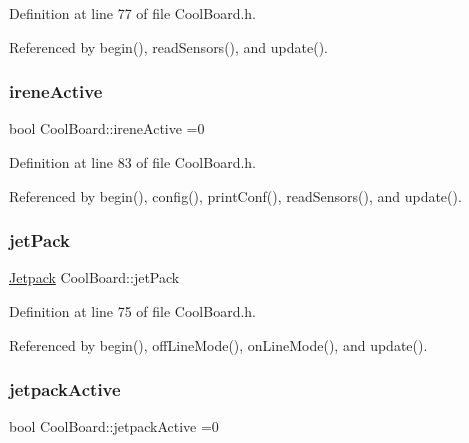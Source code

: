 Definition at line 77 of file Cool\+Board.\+h.



Referenced by begin(), read\+Sensors(), and update().

\mbox{\label{classCoolBoard_a9c3f7ac625481ee2ae802a25d97a4ae0}} 
\subsubsection{\texorpdfstring{irene\+Active}{ireneActive}}
{\footnotesize\ttfamily bool Cool\+Board\+::irene\+Active =0\hspace{0.3cm}{\ttfamily [private]}}



Definition at line 83 of file Cool\+Board.\+h.



Referenced by begin(), config(), print\+Conf(), read\+Sensors(), and update().

\mbox{\label{classCoolBoard_a30b1357881b01ccbec676856a91e48e9}} 
\subsubsection{\texorpdfstring{jet\+Pack}{jetPack}}
{\footnotesize\ttfamily \hyperlink{classJetpack}{Jetpack} Cool\+Board\+::jet\+Pack\hspace{0.3cm}{\ttfamily [private]}}



Definition at line 75 of file Cool\+Board.\+h.



Referenced by begin(), off\+Line\+Mode(), on\+Line\+Mode(), and update().

\mbox{\label{classCoolBoard_a9be03a913d26e558328935ca3b59a75e}} 
\subsubsection{\texorpdfstring{jetpack\+Active}{jetpackActive}}
{\footnotesize\ttfamily bool Cool\+Board\+::jetpack\+Active =0\hspace{0.3cm}{\ttfamily [private]}}



